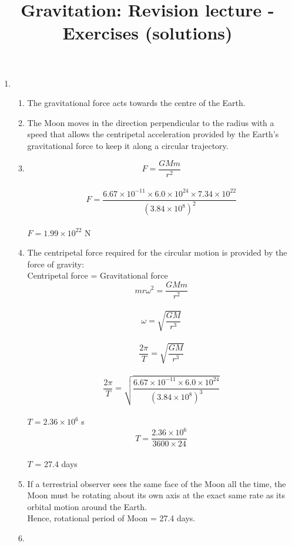 \documentclass[a4paper,12pt]{article}
\title{Gravitation: Revision lecture - Exercises (solutions)}
\date{}
\begin{document}
\maketitle

\begin{enumerate} %
\item 

\begin{enumerate}
\item The gravitational force acts towards the centre of the Earth.
\item The Moon moves in the direction perpendicular to the radius with a speed that allows the centripetal acceleration provided by the Earth's gravitational force to keep it along a circular trajectory.  
\item \[F=\frac{GMm}{r^2}\]\\
\[F=\frac{6.67\times 10^{-11}\times 6.0 \times 10^{24} \times 7.34 \times 10^{22}}{(3.84 \times 10^8)^2}\]\\
$F = 1.99 \times 10^{22}$ N\\
\item The centripetal force required for the circular motion is provided by the force of gravity:\\
Centripetal force = Gravitational force\\
\[mr\omega^2= \frac{GMm}{r^2} \]\\ 
\[\omega= \sqrt{ \frac{GM}{r^3}} \]\\ 
\[ \frac{2\pi}{T}= \sqrt{ \frac{GM}{r^3}} \]\\ 
\[ \frac{2\pi}{T}= \sqrt{ \frac{6.67\times 10^{-11}\times 6.0 \times 10^{24}}{(3.84 \times 10^8)^3}} \]\\ 
$T = 2.36 \times 10^6 $ s\\ 
\[ T = \frac{2.36 \times 10^6}{3600 \times 24} \]  \\
$T$ = 27.4 days\\
\item If a terrestrial observer sees the same face of the Moon all the time, the Moon must be rotating about its own axis at the exact same rate as its orbital motion around the Earth.\\ Hence, rotational period of Moon = 27.4 days. 
\item 
\begin{figure}[h]
    \centering
{}
\end{figure}
\end{enumerate}
\end{enumerate}
\end{document}
